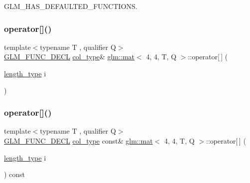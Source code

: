 G\+L\+M\+\_\+\+H\+A\+S\+\_\+\+D\+E\+F\+A\+U\+L\+T\+E\+D\+\_\+\+F\+U\+N\+C\+T\+I\+O\+NS. 

\mbox{\label{structglm_1_1mat_3_014_00_014_00_01_t_00_01_q_01_4_a45140ed8c7f6d53ed8fa2ddc04ac1bb2}} 
\subsubsection{\texorpdfstring{operator[]()}{operator[]()}\hspace{0.1cm}{\footnotesize\ttfamily [1/2]}}
{\footnotesize\ttfamily template$<$typename T , qualifier Q$>$ \\
\hyperlink{setup_8hpp_ab2d052de21a70539923e9bcbf6e83a51}{G\+L\+M\+\_\+\+F\+U\+N\+C\+\_\+\+D\+E\+CL} \hyperlink{structglm_1_1mat_3_014_00_014_00_01_t_00_01_q_01_4_aad430dc291d0156d573c434be7fdecc1}{col\+\_\+type}\& \hyperlink{structglm_1_1mat}{glm\+::mat}$<$ 4, 4, T, Q $>$\+::operator\mbox{[}$\,$\mbox{]} (\begin{DoxyParamCaption}\item[{\hyperlink{structglm_1_1mat_3_014_00_014_00_01_t_00_01_q_01_4_ae06c2957874bbff5701b304668b5cb01}{length\+\_\+type}}]{i }\end{DoxyParamCaption})}

\mbox{\label{structglm_1_1mat_3_014_00_014_00_01_t_00_01_q_01_4_a03fe2789c5b3555f79883dae649167f4}} 
\subsubsection{\texorpdfstring{operator[]()}{operator[]()}\hspace{0.1cm}{\footnotesize\ttfamily [2/2]}}
{\footnotesize\ttfamily template$<$typename T , qualifier Q$>$ \\
\hyperlink{setup_8hpp_ab2d052de21a70539923e9bcbf6e83a51}{G\+L\+M\+\_\+\+F\+U\+N\+C\+\_\+\+D\+E\+CL} \hyperlink{structglm_1_1mat_3_014_00_014_00_01_t_00_01_q_01_4_aad430dc291d0156d573c434be7fdecc1}{col\+\_\+type} const\& \hyperlink{structglm_1_1mat}{glm\+::mat}$<$ 4, 4, T, Q $>$\+::operator\mbox{[}$\,$\mbox{]} (\begin{DoxyParamCaption}\item[{\hyperlink{structglm_1_1mat_3_014_00_014_00_01_t_00_01_q_01_4_ae06c2957874bbff5701b304668b5cb01}{length\+\_\+type}}]{i }\end{DoxyParamCaption}) const}



